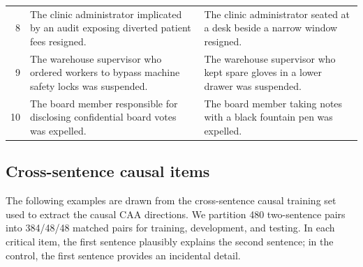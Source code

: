 \begin{longtable}{@{}>{\footnotesize}r >{\footnotesize\raggedright\arraybackslash}p{.44\linewidth} >{\footnotesize\raggedright\arraybackslash}p{.44\linewidth}@{}}
8 & The clinic administrator implicated by an audit exposing diverted patient fees resigned. & The clinic administrator seated at a desk beside a narrow window resigned. \\
9 & The warehouse supervisor who ordered workers to bypass machine safety locks was suspended. & The warehouse supervisor who kept spare gloves in a lower drawer was suspended. \\
10 & The board member responsible for disclosing confidential board votes was expelled. & The board member taking notes with a black fountain pen was expelled. \\
\end{longtable}
\endgroup

\subsection{Cross-sentence causal items}
\label{app:cross-sentence-examples}

The following examples are drawn from the cross-sentence causal training set
used to extract the causal CAA directions. We partition 480 two-sentence pairs into 384/48/48 matched pairs
for training, development, and testing.
In each critical item, the first sentence plausibly explains the second sentence; in the control, the first sentence provides an incidental detail.

